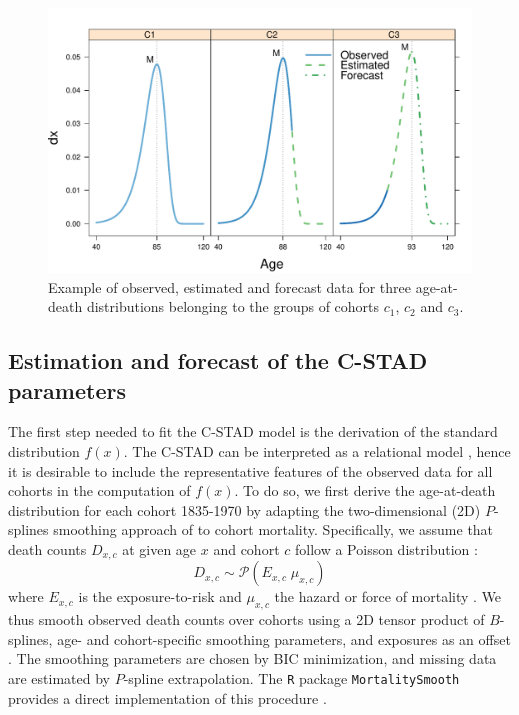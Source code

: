 \documentclass[11pt, a4paper]{article}
\begin{document}
\begin{figure}[h!]
	\begin{center}
		\includegraphics[scale=0.7]{./Figures/F3.pdf} 
		\caption{Example of observed, estimated and forecast data for three age-at-death distributions belonging to the groups of cohorts $c_1$, $c_2$ and $c_3$.\label{Fig:DxExample}}    
	\end{center}
\end{figure}

\subsection{Estimation and forecast of the C-STAD parameters}
\label{Subsec:EstimForeC-STAD}
The first step needed to fit the C-STAD model is the derivation of the standard distribution $f(x)$. The C-STAD can be interpreted as a relational model \citep{brass1971scale}, hence it is desirable to include the representative features of the observed data for all cohorts in the computation of $f(x)$. To do so, we first derive the age-at-death distribution for each cohort 1835-1970 by adapting the two-dimensional (2D) $P$-splines smoothing approach of \cite{currie2004smoothing} to cohort mortality. Specifically, we assume that death counts $D_{x,c}$ at given age $x$ and cohort $c$ follow a Poisson distribution \citep{brillinger1986biometrics}:
\begin{equation}\label{Eq:Poisson}
D_{x,c} \sim \mathcal{P}(E_{x,c} \; \mu_{x,c}) 
\end{equation}
where $E_{x,c}$ is the exposure-to-risk and $\mu_{x,c}$ the hazard or force of mortality \cite[such as in, for example,][]{brouhns2002poisson}. We thus smooth observed death counts over cohorts using a 2D tensor product of  $B$-splines, age- and cohort-specific smoothing parameters, and exposures as an offset \citep{eilers1996flexible}. The smoothing parameters are chosen by BIC minimization, and missing data are estimated by $P$-spline extrapolation. The \texttt{R} package \texttt{MortalitySmooth} provides a direct implementation of this procedure \citep{camarda2012mortalitysmooth}. \par 
\end{document}
